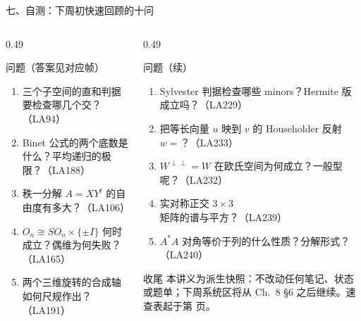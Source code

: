 \documentclass[aspectratio=169,10pt,fontset=none]{ctexbeamer}
\begin{document}
\begin{frame}[t]{七、自测：下周初快速回顾的十问}
  \begin{columns}[T,onlytextwidth]
    \begin{column}{0.49\textwidth}
      \begin{exampleblock}{\footnotesize 问题（答案见对应帧）}
        \scriptsize
        \begin{enumerate}\setlength{\itemsep}{1pt}
          \item 三个子空间的直和判据要检查哪几个交？（LA94）
          \item Binet 公式的两个底数是什么？平均递归的极限？（LA188）
          \item 秩一分解 $A=XY^t$ 的自由度有多大？（LA106）
          \item $O_n\cong SO_n\times\{\pm I\}$ 何时成立？偶维为何失败？（LA165）
          \item 两个三维旋转的合成轴如何尺规作出？（LA191）
        \end{enumerate}
      \end{exampleblock}
    \end{column}
    \begin{column}{0.49\textwidth}
      \begin{exampleblock}{\footnotesize 问题（续）}
        \scriptsize
        \begin{enumerate}\setlength{\itemsep}{1pt}\setcounter{enumi}{5}
          \item Sylvester 判据检查哪些 minors？Hermite 版成立吗？（LA229）
          \item 把等长向量 $u$ 映到 $v$ 的 Householder 反射 $w=$？（LA233）
          \item $W^{\perp\perp}=W$ 在欧氏空间为何成立？一般型呢？（LA232）
          \item 实对称正交 $3\times3$ 矩阵的谱与平方？（LA239）
          \item $A^*A$ 对角等价于列的什么性质？分解形式？（LA240）
        \end{enumerate}
      \end{exampleblock}
      \begin{block}{\footnotesize 收尾}
        \scriptsize
        本讲义为派生快照：不改动任何笔记、状态或题单；下周系统区将从 Ch.~8 \S6 之后继续。速查表起于第 \pageref{sec:answers} 页。
      \end{block}
    \end{column}
  \end{columns}
\end{frame}
\end{document}
